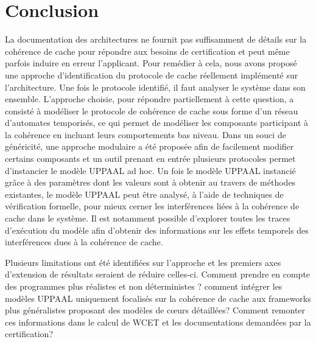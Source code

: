 \section{Conclusion}
La documentation des architectures ne fournit pas suffisamment de
détails sur la cohérence de cache pour répondre aux besoins de
certification et peut même parfois induire en erreur l'applicant.
Pour remédier à cela, nous avons proposé une approche d'identification
du protocole de cache réellement implémenté sur l'architecture.  Une
fois le protocole identifié, il faut analyser le système dans son
ensemble. L'approche choisie, pour répondre partiellement à cette
question, a consisté à modéliser le protocole de cohérence de cache
sous forme d'un réseau d'automates temporisés, ce qui permet de
modéliser les composants participant à la cohérence en incluant leurs
comportements bas niveau.  Dans un souci de généricité, une approche
modulaire a été proposée afin de facilement modifier certains
composants et un outil prenant en entrée plusieurs protocoles permet
d'instancier le modèle UPPAAL ad hoc.  Un fois le modèle UPPAAL
instancié grâce à des paramètres dont les valeurs sont à obtenir au
travers de méthodes existantes, le modèle UPPAAL peut être analysé, à
l'aide de techniques de vérification formelle, pour mieux cerner les
interférences liées à la cohérence de cache dans le système.  Il est
notamment possible d'explorer toutes les traces d'exécution du modèle
afin d'obtenir des informations sur les effets temporels des
interférences dues à la cohérence de cache.

Plusieurs limitations ont été identifiées sur l'approche et les
premiers axes d'extension de résultats seraient de réduire celles-ci.
Comment prendre en compte des programmes plus réalistes et non
déterministes ? comment intégrer les modèles UPPAAL uniquement
focalisés sur la cohérence de cache aux frameworks plus généralistes
proposant des modèles de c\oe urs détaillées?  Comment remonter ces
informations dans le calcul de WCET et les documentations demandées
par la certification?
